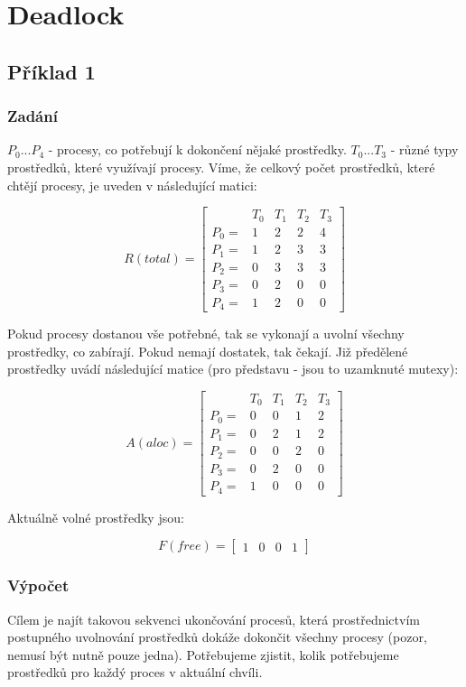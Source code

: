 \section{Deadlock}

\subsection{Příklad 1}
\subsubsection{Zadání}
$P_0 ... P_4$ - procesy, co potřebují k dokončení nějaké prostředky. $T_0 ... T_3$ - různé typy prostředků, které využívají procesy. Víme, že celkový počet prostředků, které chtějí procesy, je uveden v následující matici:

$$R(total) = \left[ \begin{array}{ccccc}
&T_0&T_1&T_2&T_3 \\
P_0=&1&2&2&4 \\
P_1=&1&2&3&3 \\ 
P_2=&0&3&3&3 \\ 
P_3=&0&2&0&0 \\ 
P_4=&1&2&0&0
\end{array} \right]$$

Pokud procesy dostanou vše potřebné, tak se vykonají a uvolní všechny prostředky, co zabírají. Pokud nemají dostatek, tak čekají. Již předělené prostředky uvádí následující matice (pro představu - jsou to uzamknuté mutexy):

$$A(aloc) = \left[ \begin{array}{ccccc}
&T_0&T_1&T_2&T_3 \\
P_0=&0&0&1&2 \\ 
P_1=&0&2&1&2 \\ 
P_2=&0&0&2&0 \\ 
P_3=&0&2&0&0 \\ 
P_4=&1&0&0&0
\end{array} \right]$$

Aktuálně volné prostředky jsou:

$$F(free) = \left[ \begin{array}{cccc}
1&0&0&1
\end{array} \right]$$


\subsubsection{Výpočet}
Cílem je najít takovou sekvenci ukončování procesů, která prostřednictvím postupného uvolnování prostředků dokáže dokončit všechny procesy (pozor, nemusí být nutně pouze jedna). Potřebujeme zjistit, kolik potřebujeme prostředků pro každý proces v aktuální chvíli.


